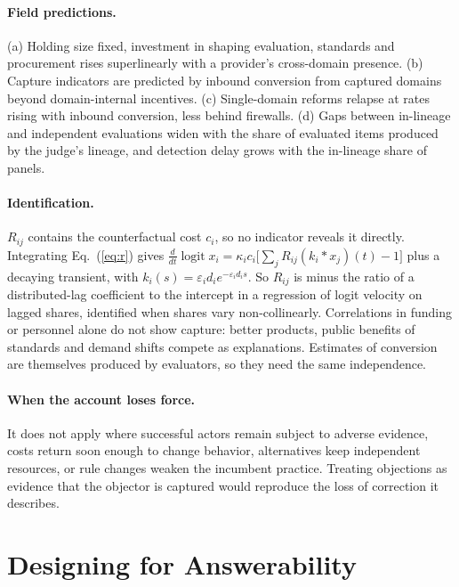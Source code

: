 \documentclass[letterpaper]{article} %
\theoremstyle{definition}
\begin{document}
\paragraph{Field predictions.} (a) Holding size fixed, investment in shaping evaluation, standards and procurement rises superlinearly with a provider's cross-domain presence. (b) Capture indicators are predicted by inbound conversion from captured domains beyond domain-internal incentives. (c) Single-domain reforms relapse at rates rising with inbound conversion, less behind firewalls. (d) Gaps between in-lineage and independent evaluations widen with the share of evaluated items produced by the judge's lineage, and detection delay grows with the in-lineage share of panels.

\paragraph{Identification.} $R_{ij}$ contains the counterfactual cost $c_i$, so no indicator reveals it directly. Integrating Eq.~(\ref{eq:r}) gives $\tfrac{d}{dt}\operatorname{logit}x_i=\kappa_ic_i\big[\sum_jR_{ij}(k_i*x_j)(t)-1\big]$ plus a decaying transient, with $k_i(s)=\varepsilon_id_ie^{-\varepsilon_id_is}$. So $R_{ij}$ is minus the ratio of a distributed-lag coefficient to the intercept in a regression of logit velocity on lagged shares, identified when shares vary non-collinearly. Correlations in funding or personnel alone do not show capture: better products, public benefits of standards and demand shifts compete as explanations. Estimates of conversion are themselves produced by evaluators, so they need the same independence.

\paragraph{When the account loses force.} It does not apply where successful actors remain subject to adverse evidence, costs return soon enough to change behavior, alternatives keep independent resources, or rule changes weaken the incumbent practice. Treating objections as evidence that the objector is captured would reproduce the loss of correction it describes.

\section{Designing for Answerability}\label{sec:design}
\end{document}
